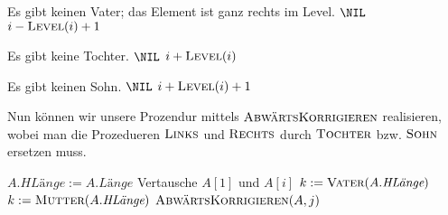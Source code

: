 \begin{solution}
\begin{enumerate}[label = \alph*]
  \phantom{}

  \begin{algorithmic}
        \Comment Es gibt keinen Vater; das Element ist ganz rechts im Level.
        \State \Return $\NIL$
      \Else
        \State \Return $i - \textsc{Level}(i) + 1$
      \EndIf
    \EndProcedure
  \end{algorithmic}

  \phantom{}

  \begin{algorithmic}
        \Comment Es gibt keine Tochter.
        \State \Return $\NIL$
      \Else
        \State \Return $i + \textsc{Level}(i)$
        \EndIf
      \EndProcedure
  \end{algorithmic}

  \phantom{}

  \begin{algorithmic}
        \Comment Es gibt keinen Sohn.
        \State \Return $\NIL$
      \Else
        \State \Return $i + \textsc{Level}(i) + 1$
      \EndIf
    \EndProcedure
  \end{algorithmic}

  \phantom{}


  Nun können wir unsere Prozendur mittels $\textsc{AbwärtsKorrigieren}$ realisieren, wobei man die Prozedueren $\textsc{Links}$ und $\textsc{Rechts}$ durch $\textsc{Tochter}$ bzw. $\textsc{Sohn}$ ersetzen muss.

  \phantom{}

  \begin{algorithmic}
      \State $A.\textit{HLänge} := A.\textit{Länge}$
      \State Vertausche $A[1]$ und $A[i]$
      \State $k := \textsc{Vater}(A.\textit{HLänge})$
        \State $k := \textsc{Mutter}(A.\textit{HLänge})$
      \EndIf
          \State $\textsc{AbwärtsKorrigieren}(A, j)$
        \EndFor
      \EndIf
    \EndProcedure
  \end{algorithmic}

\end{enumerate}

\end{solution}

